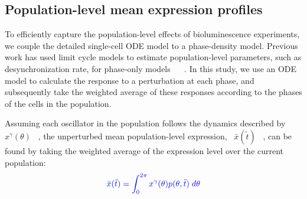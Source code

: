 \documentclass[11pt, letterpaper]{article}
\providecommand{\DIFadd}[1]{{\protect\color{blue}#1}} %
\providecommand{\DIFdel}[1]{{\protect\color{red}}}                      %
\providecommand{\DIFaddbegin}{} %
\providecommand{\DIFaddend}{} %
\providecommand{\DIFdelbegin}{} %
\providecommand{\DIFdelend}{} %
\begin{document}
\DIFdelbegin \DIFdel{In Fig. 4A, we plot single-cell and population-level response curves resulting
from a parameter pulse. In the PRC plot, the single-cell and population curves
are largely similar, in which }\DIFdelend \DIFaddbegin \subsection*{\DIFadd{Population-level mean expression profiles}}

\DIFadd{To efficiently capture }\DIFaddend the population-level \DIFdelbegin \DIFdel{phase change is a slightly
smoothed version of the single-cell response curve.
This smoothing occurs since
the population has an averaging effect on incoming perturbations, with each
cell receiving the input at a slightly different internal phase.
In the ARC
plot, the shape of the }\DIFdelend \DIFaddbegin \DIFadd{effects of bioluminescence experiments, we couple the detailed }\DIFaddend single-cell \DIFdelbegin \DIFdel{and population-based ARC are different,
since they derived from separate mechanisms and describe different changes in the output trajectories}\DIFdelend \DIFaddbegin \DIFadd{ODE model to a phase-density model.
Previous work has used limit cycle models to estimate population-level parameters, such as desynchronization rate, for phase-only models \mbox{%
\cite{Rougemont2007}
}%
.
In this study, we use an ODE model to calculate the response to a perturbation at each phase, and subsequently take the weighted average of these responses according to the phases of the cells in the population}\DIFaddend .

\DIFdelbegin \DIFdel{Using these response curves, we demonstrate characteristic features of
amplitude change mediated at the single-cell and }\DIFdelend \DIFaddbegin \DIFadd{Assuming each oscillator in the population follows the dynamics described by \mbox{%
$x^\gamma(\theta)$
}%
, the unperturbed mean }\DIFaddend population-level \DIFdelbegin \DIFdel{. In Fig. 4B
the perturbation does not cause a significant change in phase or populationsynchrony, yet strongly reduces single-cell amplitudes. The resulting
}\DIFdelend \DIFaddbegin \DIFadd{expression, \mbox{%
$\bar{x}(\tilde{t})$
}%
, can be found by taking the weighted average of the expression level over the current population:
}\begin{equation}\DIFadd{
  \bar{x}(\tilde{t}) = \int_0^{2\pi} x^\gamma(\theta) p(\theta, \tilde{t}) \;
  d\theta
  \label{eq:xbar}
}\end{equation}
\end{document}
